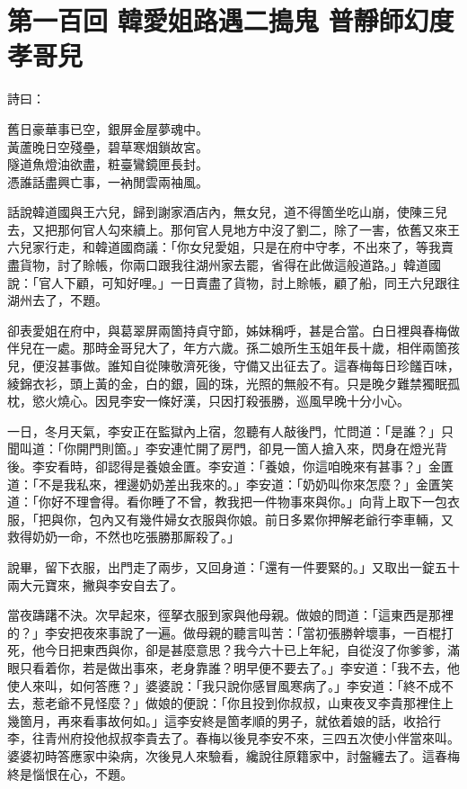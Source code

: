 
\chapter*{第一百回 韓愛姐路遇二搗鬼 普靜師幻度孝哥兒}


詩曰：

\begin{myquote}
舊日豪華事已空，銀屏金屋夢魂中。\\黃蘆晚日空殘壘，碧草寒烟鎖故宮。\\隧道魚燈油欲盡，粧臺鸞鏡匣長封。\\憑誰話盡興亡事，一衲閒雲兩袖風。
\end{myquote}

話說韓道國與王六兒，歸到謝家酒店內，無女兒，道不得箇坐吃山崩，使陳三兒去，又把那何官人勾來續上。那何官人見地方中沒了劉二，除了一害，依舊又來王六兒家行走，和韓道國商議：「你女兒愛姐，只是在府中守孝，不出來了，等我賣盡貨物，討了賒帳，你兩口跟我往湖州家去罷，省得在此做這般道路。」韓道國說：「官人下顧，可知好哩。」{}一日賣盡了貨物，討上賒帳，顧了船，同王六兒跟往湖州去了，不題。

卻表愛姐在府中，與葛翠屏兩箇持貞守節，姊妹稱呼，甚是合當。白日裡與春梅做伴兒在一處。那時金哥兒大了，年方六歲。孫二娘所生玉姐年長十歲，相伴兩箇孩兒，便沒甚事做。誰知自從陳敬濟死後，守備又出征去了。這春梅每日珍饈百味，綾錦衣衫，頭上黃的金，白的銀，圓的珠，光照的無般不有。只是晚夕難禁獨眠孤枕，慾火燒心。{}因見李安一條好漢，只因打殺張勝，巡風早晚十分小心。

一日，冬月天氣，李安正在監獄內上宿，忽聽有人敲後門，忙問道：「是誰？」只聞叫道：「你開門則箇。」李安連忙開了房門，卻見一箇人搶入來，閃身在燈光背後。李安看時，卻認得是養娘金匱。李安道：「養娘，你這咱晚來有甚事？」金匱道：「不是我私來，裡邊奶奶差出我來的。」李安道：「奶奶叫你來怎麼？」金匱笑道：「你好不理會得。看你睡了不曾，教我把一件物事來與你。」向背上取下一包衣服，「把與你，包內又有幾件婦女衣服與你娘。前日多累你押解老爺行李車輛，又救得奶奶一命，不然也吃張勝那厮殺了。」

說畢，留下衣服，出門走了兩步，又回身道：「還有一件要緊的。」又取出一錠五十兩大元寶來，撇與李安自去了。

當夜躊躇不決。次早起來，徑拏衣服到家與他母親。做娘的問道：「這東西是那裡的？」李安把夜來事說了一遍。做母親的聽言叫苦：「當初張勝幹壞事，一百棍打死，他今日把東西與你，卻是甚麼意思？我今六十已上年紀，自從沒了你爹爹，滿眼只看着你，若是做出事來，老身靠誰？明早便不要去了。」{}李安道：「我不去，他使人來叫，如何答應？」婆婆說：「我只說你感冒風寒病了。」李安道：「終不成不去，惹老爺不見怪麼？」做娘的便說：「你且投到你叔叔，山東夜叉李貴那裡住上幾箇月，再來看事故何如。」這李安終是箇孝順的男子，就依着娘的話，收拾行李，往青州府投他叔叔李貴去了。春梅以後見李安不來，三四五次使小伴當來叫。婆婆初時答應家中染病，次後見人來驗看，纔說往原籍家中，討盤纏去了。這春梅終是惱恨在心，不題。

